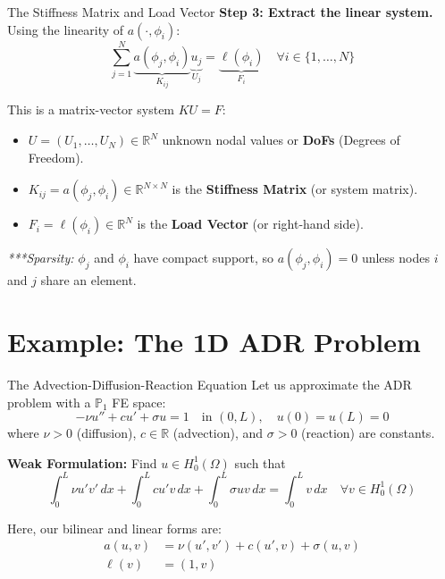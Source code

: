\documentclass[aspectratio=169]{beamer}
\renewcommand{\P}{\mathbb{P}}
\newcommand{\R}{\mathbb{R}}
\begin{document}
\begin{frame}{The Stiffness Matrix and Load Vector}
    \textbf{Step 3: Extract the linear system.}
    Using the linearity of $a(\cdot, \phi_i)$:
    $$ \sum_{j=1}^N \underbrace{a(\phi_j, \phi_i)}_{K_{ij}}\underbrace{u_j}_{U_j} = \underbrace{\ell(\phi_i)}_{F_i} \quad \forall i \in \{1, \dots, N\} $$
    
    This is a matrix-vector system $K U = F$:
    \begin{itemize}
        \item $U = (U_1, \dots, U_N) \in \R^N$ unknown nodal values or \textbf{DoFs} (Degrees of Freedom).
        \item $K_{ij} = a(\phi_j, \phi_i) \in \R^{N\times N}$ is the \textbf{Stiffness Matrix} (or system matrix).
        \item $F_i = \ell(\phi_i) \in \R^N$ is the \textbf{Load Vector} (or right-hand side).
    \end{itemize}
    
    \vspace{0.5cm}
    \begin{footnotesize}
        \textit{***Sparsity:} $\phi_j$ and $\phi_i$ have compact support, so $a(\phi_j, \phi_i) = 0$ unless nodes $i$ and $j$ share an element.
    \end{footnotesize}
\end{frame}

\section{Example: The 1D ADR Problem}

\begin{frame}{The Advection-Diffusion-Reaction Equation}
    Let us approximate the ADR problem with a $\P_1$  FE space:
    $$ -\nu u'' + c u' + \sigma u = 1 \quad \text{in } (0, L), \quad u(0) = u(L) = 0 $$
    where $\nu > 0$ (diffusion), $c \in \mathbb{R}$ (advection), and $\sigma > 0$ (reaction) are constants.
    
    \vspace{0.3cm}
    \textbf{Weak Formulation:} Find $u \in H^1_0(\Omega)$ such that
    $$ \int_0^L \nu u' v' \, dx + \int_0^L c u' v \, dx + \int_0^L \sigma u v \, dx = \int_0^L v \, dx \quad \forall v \in H^1_0(\Omega) $$
    
    Here, our bilinear and linear forms are:
    \begin{align*}
        a(u, v) &= \nu(u', v') + c(u', v) + \sigma(u, v) \\
        \ell(v) &= (1, v)
    \end{align*}
\end{frame}
\end{document}
